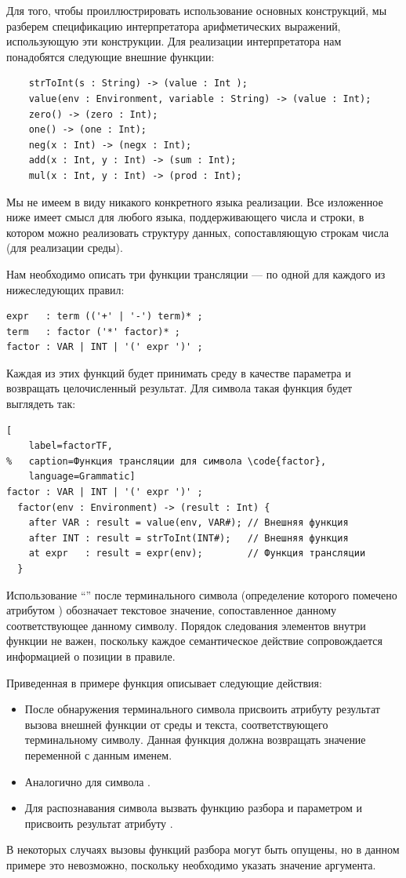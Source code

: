 Для того, чтобы проиллюстрировать использование основных конструкций, мы разберем спецификацию интерпретатора арифметических выражений, использующую эти конструкции. Для реализации интерпретатора нам понадобятся следующие внешние функции:
\begin{lstlisting}
	strToInt(s : String) -> (value : Int );
	value(env : Environment, variable : String) -> (value : Int);
	zero() -> (zero : Int);
	one() -> (one : Int);
	neg(x : Int) -> (negx : Int);
	add(x : Int, y : Int) -> (sum : Int);
	mul(x : Int, y : Int) -> (prod : Int);
\end{lstlisting}
Мы не имеем в виду никакого конкретного языка реализации. Все изложенное ниже имеет смысл для любого языка, поддерживающего числа и строки, в котором можно реализовать структуру данных, сопоставляющую строкам числа (для реализации среды).

Нам необходимо описать три функции трансляции --- по одной для каждого из нижеследующих правил:
\begin{lstlisting}
expr   : term (('+' | '-') term)* ;
term   : factor ('*' factor)* ;
factor : VAR | INT | '(' expr ')' ;
\end{lstlisting}
Каждая из этих функций будет принимать среду в качестве параметра и возвращать целочисленный результат. Для символа  такая функция будет выглядеть так:
\begin{lstlisting}[
	label=factorTF,
%	caption=Функция трансляции для символа \code{factor},
	language=Grammatic]
factor : VAR | INT | '(' expr ')' ;           
  factor(env : Environment) -> (result : Int) { 
    after VAR : result = value(env, VAR#); // Внешняя функция
    after INT : result = strToInt(INT#);   // Внешняя функция
    at expr   : result = expr(env);        // Функция трансляции
  }
\end{lstlisting}
Использование ``\code{\#}'' после терминального символа (определение которого помечено атрибутом ) обозначает текстовое значение, сопоставленное данному соответствующее данному символу. Порядок следования элементов внутри функции не важен, поскольку каждое семантическое действие сопровождается информацией о позиции в правиле.

Приведенная в примере функция описывает следующие действия: 
\begin{itemize}
\item После обнаружения терминального символа  присвоить атрибуту  результат вызова внешней функции  от среды  и текста, соответствующего терминальному символу. Данная функция должна возвращать значение переменной с данным именем.
\item Аналогично для символа .
\item Для распознавания символа  вызвать функцию разбора  и параметром  и присвоить результат атрибуту .
\end{itemize}
В некоторых случаях вызовы функций разбора могут быть опущены, но в данном примере это невозможно, поскольку необходимо указать значение аргумента.

